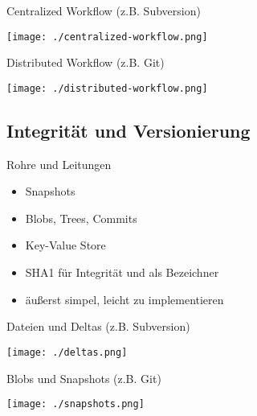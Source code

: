 \begin{frame}{Centralized Workflow (z.B. Subversion)}
    \centerline{\texttt{[image: ./centralized-workflow.png]}}
\end{frame}

\begin{frame}{Distributed Workflow (z.B. Git)}
    \centerline{\texttt{[image: ./distributed-workflow.png]}}
\end{frame}

\subsection{Integrität und Versionierung}

\begin{frame}{Rohre und Leitungen}
    \begin{itemize}[<+->]
        \item Snapshots
        \item Blobs, Trees, Commits
        \item Key-Value Store
        \item SHA1 für Integrität und als Bezeichner
        \item äußerst simpel, leicht zu implementieren
    \end{itemize}
\end{frame}

\begin{frame}{Dateien und Deltas (z.B. Subversion)}
    \centerline{\texttt{[image: ./deltas.png]}}
\end{frame}

\begin{frame}{Blobs und Snapshots (z.B. Git)}
    \centerline{\texttt{[image: ./snapshots.png]}}
\end{frame}


